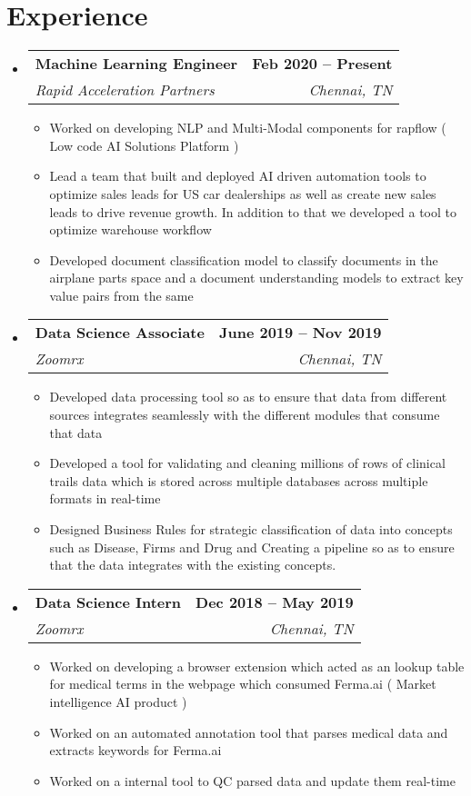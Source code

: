 \documentclass[letterpaper,10pt]{article}
\makeatletter
\newcommand{\resumeItem}[1]{
  \item\small{
    {#1 \vspace{-2pt}}
  }
}
\newcommand{\resumeSubheading}[4]{
  \vspace{-2pt}\item
    \begin{tabular*}{1.0\textwidth}[t]{l@{\extracolsep{\fill}}r}
      \textbf{#1} & \textbf{\small #2} \\
      \textit{\small#3} & \textit{\small #4} \\
    \end{tabular*}\vspace{-7pt}
}
\newcommand{\resumeSubHeadingListStart}{\begin{itemize}[leftmargin=0.0in, label={}]}
\newcommand{\resumeSubHeadingListEnd}{\end{itemize}}
\newcommand{\resumeItemListStart}{\begin{itemize}}
\newcommand{\resumeItemListEnd}{\end{itemize}\vspace{-5pt}}
\makeatother
\begin{document}
\section{Experience}
  \resumeSubHeadingListStart
      
    \resumeSubheading
      {Machine Learning Engineer}{Feb 2020 -- Present}
      {Rapid Acceleration Partners}{Chennai, TN}
      \resumeItemListStart
        \resumeItem{Worked on developing NLP and Multi-Modal components for rapflow ( Low code AI Solutions Platform )}
        \resumeItem{Lead a team that built and deployed AI driven automation tools to optimize sales leads for US car dealerships as well as create new sales leads to drive revenue growth. In addition to that we developed a tool to optimize warehouse workflow}
        \resumeItem{Developed document classification model to classify documents in the airplane parts space and a document understanding models to extract key value pairs from the same}
    \resumeItemListEnd

    \resumeSubheading
      {Data Science Associate}{June 2019 -- Nov 2019}
      {Zoomrx}{Chennai, TN}
      \resumeItemListStart
        \resumeItem{Developed data processing tool so as to ensure that data from different sources integrates seamlessly with the different modules that consume that data}
        \resumeItem{Developed a tool for validating and cleaning millions of rows of clinical trails data which is stored across multiple databases across multiple formats in real-time}
        \resumeItem{Designed Business Rules for strategic classification of data into concepts such as Disease, Firms  and Drug and Creating a pipeline so as to ensure that the data integrates with the existing concepts.}
      \resumeItemListEnd

    \resumeSubheading
      {Data Science Intern}{Dec 2018 -- May 2019}
      {Zoomrx}{Chennai, TN}
      \resumeItemListStart
        \resumeItem{Worked on developing a browser extension which acted as an lookup table for medical terms in the webpage which consumed Ferma.ai ( Market intelligence AI product )}
        \resumeItem{Worked on an automated annotation tool that parses medical data and extracts keywords for Ferma.ai}
        \resumeItem{Worked on a internal tool to QC parsed data and update them real-time}
      \resumeItemListEnd
    
  \resumeSubHeadingListEnd
\vspace{-16pt}

\end{document}
